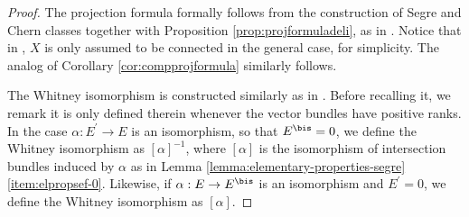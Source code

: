\begin{proof}

The projection formula formally follows from the construction of Segre and Chern classes together with Proposition \ref{prop:projformuladeli}, as in
\cite[\textsection V.4.2]{Elkikfib}. Notice that in \loccit, $X$ is only assumed to be connected in the general case, for simplicity. The analog of Corollary \ref{cor:compprojformula} similarly follows.

The Whitney isomorphism is constructed similarly as in \cite[\textsection V.4.8]{Elkikfib}. Before recalling it, we remark it is only defined therein whenever the vector bundles have positive ranks. In the case $\alpha: E^{\prime} \to E$ is an isomorphism, so that $E^{\bis}=0$, we define the Whitney isomorphism as $[\alpha]^{-1}$, where $[\alpha]$ is the isomorphism of intersection bundles induced by $\alpha$ as in Lemma \ref{lemma:elementary-properties-segre}\eqref{item:elpropsef-0}. Likewise, if $\alpha: E\to E^{\bis}$ is an isomorphism and $E^{\prime}=0$, we define the Whitney isomorphism as $[\alpha]$.


\end{proof}
